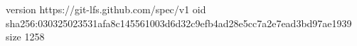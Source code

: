 version https://git-lfs.github.com/spec/v1
oid sha256:030325023531afa8c145561003d6d32c9efb4ad28e5cc7a2e7ead3bd97ae1939
size 1258
